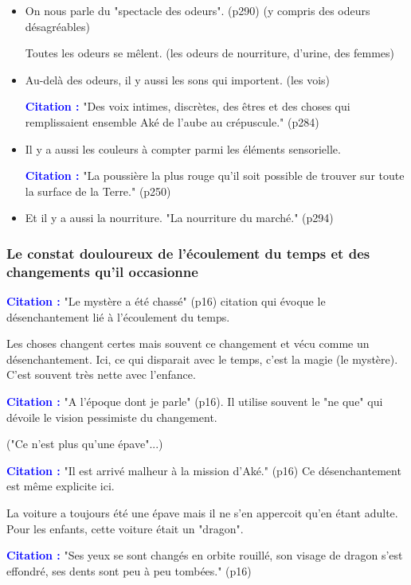 \documentclass[a4paper, 11pt, hidelinks]{article}
\newcommand{\cit}{\large \textcolor{blue}{\textbf{Citation :}} \large }
\begin{document}
\begin{itemize}
    \item On nous parle du "spectacle des odeurs". (p290) (y compris des odeurs désagréables)

Toutes les odeurs se mêlent. (les odeurs de nourriture, d'urine, des femmes)


    \item Au-delà des odeurs, il y aussi les sons qui importent. (les vois)

\cit "Des voix intimes, discrètes, des êtres et des choses qui remplissaient ensemble Aké de l'aube au crépuscule." (p284)


    \item Il y a aussi les couleurs à compter parmi les éléments sensorielle. 

\cit "La poussière la plus rouge qu'il soit possible de trouver sur toute la surface de la Terre." (p250)


    \item Et il y a aussi la nourriture.
\citation "La nourriture du marché." (p294)
\end{itemize}



\subsubsection{Le constat douloureux de l'écoulement du temps et des changements qu'il occasionne}



\cit "Le mystère a été chassé" (p16) citation qui évoque le désenchantement lié à l'écoulement du temps.

Les choses changent certes mais souvent ce changement et vécu comme un désenchantement. Ici, ce qui disparait avec le temps,
c'est la magie (le mystère). C'est souvent très nette avec l'enfance.


\cit "A l'époque dont je parle" (p16). Il utilise souvent le "ne que" qui dévoile le vision pessimiste du changement.

("Ce n'est plus qu'une épave"...)


\cit "Il est arrivé malheur à la mission d'Aké." (p16) Ce désenchantement est même explicite ici.

La voiture a toujours été une épave mais il ne s'en appercoit qu'en étant adulte. Pour les enfants, cette voiture
était un "dragon".


\cit "Ses yeux se sont changés en orbite rouillé, son visage de dragon s'est effondré, ses dents sont peu à peu tombées." (p16)
\end{document}
